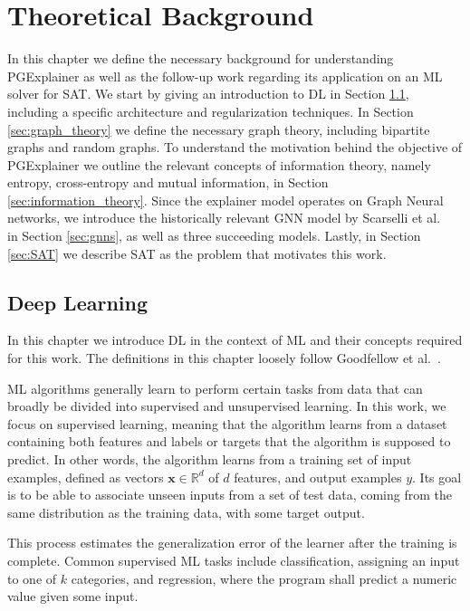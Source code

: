 \chapter{Theoretical Background}
\label{ch:Background}
In this chapter we define the necessary background for understanding PGExplainer as well as the follow-up work regarding its application on an ML solver for SAT. We start by giving an introduction to DL in Section \ref{sec:deep_learning}, including a specific architecture and regularization techniques. In Section \ref{sec:graph_theory} we define the necessary graph theory, including bipartite graphs and random graphs. To understand the motivation behind the objective of PGExplainer we outline the relevant concepts of information theory, namely entropy, cross-entropy and mutual information, in Section \ref{sec:information_theory}. Since the explainer model operates on Graph Neural networks, we introduce the historically relevant GNN model by Scarselli et al. ~\cite{4700287} in Section \ref{sec:gnns}, as well as three succeeding models. Lastly, in Section \ref{sec:SAT} we describe SAT as the problem that motivates this work.

\section{Deep Learning}
\label{sec:deep_learning}
In this chapter we introduce DL in the context of ML and their concepts required for this work. The definitions in this chapter loosely follow Goodfellow et al.~\cite{Goodfellow-et-al-2016}.

ML algorithms generally learn to perform certain tasks from data that can broadly be divided into supervised and unsupervised learning. In this work, we focus on supervised learning, meaning that the algorithm learns from a dataset containing both features and labels or targets that the algorithm is supposed to predict. In other words, the algorithm learns from a training set of input examples, defined as vectors $\mathbf{x} \in \mathbb{R}^d$ of $d$ features, and output examples $y$. Its goal is to be able to associate unseen inputs from a set of test data, coming from the same distribution as the training data, with some target output.

This process estimates the generalization error of the learner after the training is complete. 
Common supervised ML tasks include classification, assigning an input to one of $k$ categories, and regression, where the program shall predict a numeric value given some input. \bigskip

